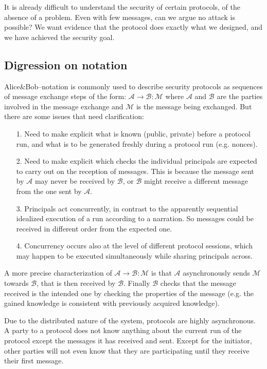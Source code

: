 It is already difficult to understand the security of certain protocols, of the absence of a problem. Even with few messages, can we argue no attack is possible? We want evidence that the protocol does exactly what we designed, and we have achieved the security goal.

\subsection{Digression on notation}

Alice\&Bob–notation is commonly used to describe security protocols as sequences of message exchange steps of the form: $\mathcal{A} \rightarrow \mathcal{B}: \mathcal{M}$  where $\mathcal{A}$ and $\mathcal{B}$ are the parties involved in the message exchange and $\mathcal{M}$ is the message being exchanged.
But there are some issues that need clarification:
\begin{itemize}
	\item [1.] Need to make explicit what is known (public, private) before a protocol run, and what is to be generated freshly during a protocol run (e.g. nonces).
	\item [2.] Need to make explicit which checks the individual principals are expected to carry out on the reception of messages. This is because the message sent by $\mathcal{A}$ may never be received by $\mathcal{B}$, or $\mathcal{B}$ might receive a different message from the one sent by $\mathcal{A}$.
	\item [3.] Principals act concurrently, in contrast to the apparently sequential idealized execution of a run according to a narration. So messages could be received in different order from the expected one.
	\item [4.] Concurrency occurs also at the level of different protocol sessions, which may happen to be executed simultaneously while sharing principals across.
\end{itemize}

A more precise characterization of $\mathcal{A} \rightarrow \mathcal{B}: \mathcal{M}$ is that $\mathcal{A}$ asynchronously sends $\mathcal{M}$ towards $\mathcal{B}$, that is then received by $\mathcal{B}$. Finally $\mathcal{B}$ checks that the message received is the intended one by checking the properties of the message (e.g. the gained knowledge is consistent with previously acquired knowledge).

Due to the distributed nature of the system, protocols are highly asynchronous. A party to a protocol does not know anything about the current run of the protocol except the messages it has received and sent. Except for the initiator, other parties will not even know that they are participating until they receive their first message.

